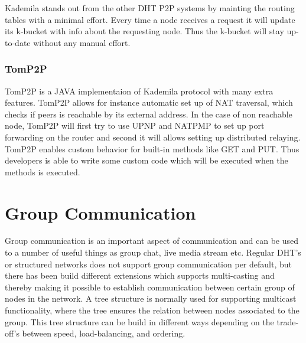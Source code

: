 Kademila stands out from the other DHT P2P systems by mainting the routing tables with a minimal effort. Every time a node receives a request it will update its k-bucket with info about the requesting node. Thus the k-bucket will stay up-to-date without any manual effort.



\subsubsection{TomP2P}
TomP2P is a JAVA implementaion of Kademila protocol with many extra features. TomP2P allows for instance automatic set up of NAT traversal, which checks if peers is reachable by its external address. In the case of non reachable node, TomP2P will first try to use UPNP and NATPMP to set up port forwarding on the router and second it will allows setting up distributed relaying. TomP2P enables custom behavior for built-in methods like GET and PUT. Thus developers is able to write some custom code which will be executed when the methods is executed.



\section{Group Communication}
Group communication is an important aspect of communication and can be used to a number of useful things as group chat, live media stream etc.
Regular DHT's or structured networks does not support group communication per default, but there has been build different extensions which supports multi-casting and thereby making it possible to establish communication between certain group of nodes in the network. 
A tree structure is normally used for supporting multicast functionality, where the tree ensures the relation between nodes associated to the group. This tree structure can be build in different ways depending on the trade-off's between speed, load-balancing, and ordering.

